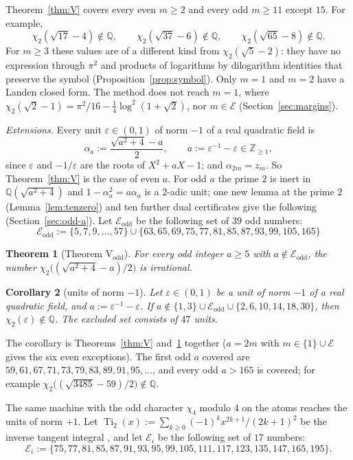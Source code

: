\documentclass[11pt]{amsart}
\newtheorem{theorem}{Theorem}[section]
\newtheorem{corollary}[theorem]{Corollary}
\theoremstyle{definition}
\theoremstyle{remark}
\numberwithin{equation}{section}
\newcommand{\ZZ}{\mathbb{Z}}
\newcommand{\QQ}{\mathbb{Q}}
\newcommand{\cE}{\mathcal{E}}
\newcommand{\eps}{\varepsilon}
\newcommand{\Ti}{\operatorname{Ti}}
\begin{document}
Theorem~\ref{thm:V} covers every even $m\ge2$ and every odd $m\ge11$ except $15$. For example,
\[
  \chi_2(\sqrt{17}-4)\notin\QQ,\qquad \chi_2(\sqrt{37}-6)\notin\QQ,\qquad \chi_2(\sqrt{65}-8)\notin\QQ .
\]
For $m\ge3$ these values are of a different kind from $\chi_2(\sqrt5-2)$: they have no expression through $\pi^2$ and
products of logarithms by dilogarithm identities that preserve the symbol (Proposition~\ref{prop:symbol}). Only $m=1$ and
$m=2$ have a Landen closed form. The method does not reach $m=1$, where
$\chi_2(\sqrt2-1)=\pi^2/16-\frac14\log^2(1+\sqrt2)$, nor $m\in\cE$ (Section~\ref{sec:margins}).

\emph{Extensions.} Every unit $\eps\in(0,1)$ of norm $-1$ of a real quadratic field is
\[
  \alpha_a:=\frac{\sqrt{a^2+4}-a}2,\qquad a:=\eps^{-1}-\eps\in\ZZ_{\ge1},
\]
since $\eps$ and $-1/\eps$ are the roots of $X^2+aX-1$; and $\alpha_{2m}=z_m$. So Theorem~\ref{thm:V} is the case of
even $a$. For odd $a$ the prime $2$ is inert in $\QQ(\sqrt{a^2+4})$ and $1-\alpha_a^2=a\alpha_a$ is a $2$-adic unit;
one new lemma at the prime $2$ (Lemma~\ref{lem:tenzero}) and ten further dual certificates give the following
(Section~\ref{sec:odd-a}). Let $\cE_{\mathrm{odd}}$ be the following set of $39$ odd numbers:
\[
  \cE_{\mathrm{odd}}:=\{5,7,9,\dots,57\}\cup\{63,65,69,75,77,81,85,87,93,99,105,165\}
\]

\begin{theorem}[Theorem V$_{\mathrm{odd}}$]\label{thm:Vodd}
For every odd integer $a\ge5$ with $a\notin\cE_{\mathrm{odd}}$, the number $\chi_2\bigl((\sqrt{a^2+4}-a)/2\bigr)$ is
irrational.
\end{theorem}

\begin{corollary}[units of norm $-1$]\label{cor:normminus}
Let $\eps\in(0,1)$ be a unit of norm $-1$ of a real quadratic field, and $a:=\eps^{-1}-\eps$. If
$a\notin\{1,3\}\cup\cE_{\mathrm{odd}}\cup\{2,6,10,14,18,30\}$, then $\chi_2(\eps)\notin\QQ$. The excluded set consists of
$47$ units.
\end{corollary}

The corollary is Theorems~\ref{thm:V} and~\ref{thm:Vodd} together ($a=2m$ with $m\in\{1\}\cup\cE$ gives the six even
exceptions). The first odd $a$ covered are $59,61,67,71,73,79,83,89,91,95,\dots$, and every odd $a>165$ is covered; for
example $\chi_2\bigl((\sqrt{3485}-59)/2\bigr)\notin\QQ$.

The same machine with the odd character $\chi_4$ modulo $4$ on the atoms reaches the units of norm $+1$. Let
$\Ti_2(x):=\sum_{k\ge0}(-1)^kx^{2k+1}/(2k+1)^2$ be the inverse tangent integral \cite[Ch.~2]{Lewin1981}, and let $\cE_i$ be the following set of $17$ numbers:
\[
  \cE_i:=\{75,77,81,85,87,91,93,95,99,105,111,117,123,135,147,165,195\}.
\]
\end{document}
